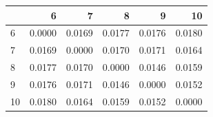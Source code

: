 \begin{tabular}{lrrrrr}
\toprule
 & 6 & 7 & 8 & 9 & 10 \\
\midrule
6 & 0.0000 & 0.0169 & 0.0177 & 0.0176 & 0.0180 \\
7 & 0.0169 & 0.0000 & 0.0170 & 0.0171 & 0.0164 \\
8 & 0.0177 & 0.0170 & 0.0000 & 0.0146 & 0.0159 \\
9 & 0.0176 & 0.0171 & 0.0146 & 0.0000 & 0.0152 \\
10 & 0.0180 & 0.0164 & 0.0159 & 0.0152 & 0.0000 \\
\bottomrule
\end{tabular}
